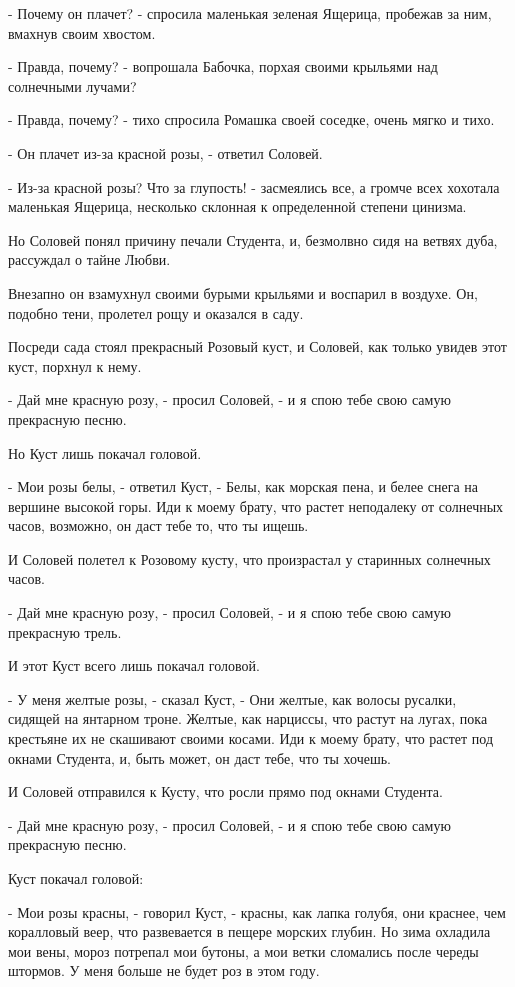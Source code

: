 \documentclass[a4paper]{article}
\theoremstyle{defin}
\theoremstyle{theorem}
\theoremstyle{prop}
\theoremstyle{lemma}
\theoremstyle{ex}
\theoremstyle{col}
\begin{document}
- Почему он плачет? - спросила маленькая зеленая Ящерица, пробежав за ним, вмахнув своим хвостом.

- Правда, почему? - вопрошала Бабочка, порхая своими крыльями над солнечными лучами?

- Правда, почему? - тихо спросила Ромашка своей соседке, очень мягко и тихо.

- Он плачет из-за красной розы, - ответил Соловей.

- Из-за красной розы? Что за глупость! - засмеялись все, а громче всех хохотала маленькая Ящерица, несколько склонная к определенной степени цинизма.

Но Соловей понял причину печали Студента, и, безмолвно сидя на ветвях дуба, рассуждал о тайне Любви.

Внезапно он взамухнул своими бурыми крыльями и воспарил в воздухе. Он, подобно тени, пролетел рощу и оказался в саду.

Посреди сада стоял прекрасный Розовый куст, и Соловей, как только увидев этот куст, порхнул к нему.

- Дай мне красную розу, - просил Соловей, - и я спою тебе свою самую прекрасную песню.

Но Куст лишь покачал головой.

- Мои розы белы, - ответил Куст, - Белы, как морская пена, и белее снега на вершине высокой горы. Иди к моему брату, что растет неподалеку от солнечных часов, возможно, он даст тебе то, что ты ищешь.

И Соловей полетел к Розовому кусту, что произрастал у старинных солнечных часов.

- Дай мне красную розу, - просил Соловей, - и я спою тебе свою самую прекрасную трель.

И этот Куст всего лишь покачал головой.

- У меня желтые розы, - сказал Куст, - Они желтые, как волосы русалки, сидящей на янтарном троне. Желтые, как нарциссы, что растут на лугах, пока крестьяне их не скашивают своими косами. Иди к моему брату, что растет под окнами Студента, и, быть может, он даст тебе, что ты хочешь.

И Соловей отправился к Кусту, что росли прямо под окнами Студента.

- Дай мне красную розу, - просил Соловей, - и я спою тебе свою самую прекрасную песню.

Куст покачал головой:

- Мои розы красны, - говорил Куст, - красны, как лапка голубя, они краснее, чем коралловый веер, что развевается в пещере морских глубин. Но зима охладила мои вены, мороз потрепал мои бутоны, а мои ветки сломались после череды штормов. У меня больше не будет роз в этом году.
\end{document}
